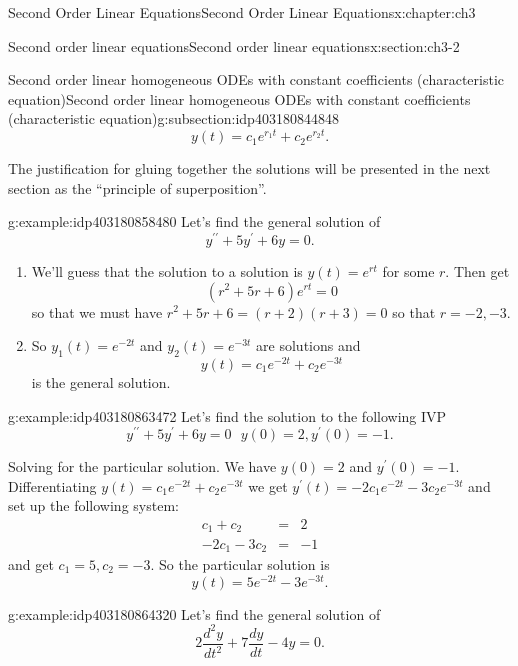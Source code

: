 \documentclass[oneside,10pt,]{book}
\numberwithin{equation}{section}
\numberwithin{equation}{section}
\newcommand{\amp}{&}
\begin{document}
\begin{chapterptx}{Second Order Linear Equations}{}{Second Order Linear Equations}{}{}{x:chapter:ch3}
\begin{sectionptx}{Second order linear equations}{}{Second order linear equations}{}{}{x:section:ch3-2}
\begin{subsectionptx}{Second order linear homogeneous ODEs with constant coefficients (characteristic equation)}{}{Second order linear homogeneous ODEs with constant coefficients (characteristic equation)}{}{}{g:subsection:idp403180844848}
\begin{equation*}
y(t)=c_{1}e^{r_{1}t}+c_{2}e^{r_{2}t}.
\end{equation*}
%
\par
The justification for gluing together the solutions will be presented in the next section as the ``principle of superposition''.%
\begin{example}{}{g:example:idp403180858480}%
Let's find the general solution of%
\begin{equation*}
y^{\prime\prime}+5y^{\prime}+6y=0.
\end{equation*}
%
%
\begin{enumerate}
\item{}We'll guess that the solution to a solution is \(y(t)=e^{rt}\) for some \(r\). Then get%
\begin{equation*}
\left(r^{2}+5r+6\right)e^{rt}=0
\end{equation*}
so that we must have \(r^{2}+5r+6=\left(r+2\right)\left(r+3\right)=0\) so that \(r=-2,-3\).%
\item{}So \(y_{1}(t)=e^{-2t}\) and \(y_{2}(t)=e^{-3t}\) are solutions and%
\begin{equation*}
y(t)=c_{1}e^{-2t}+c_{2}e^{-3t}
\end{equation*}
is the general solution.%
\end{enumerate}
\end{example}
\begin{example}{}{g:example:idp403180863472}%
Let's find the solution to the following IVP%
\begin{equation*}
y^{\prime\prime}+5y^{\prime}+6y=0\,\,\,\,y(0)=2,y^{\prime}(0)=-1.
\end{equation*}
%
\par
Solving for the particular solution. We have \(y(0)=2\) and \(y^{\prime}(0)=-1\). Differentiating \(y(t)=c_{1}e^{-2t}+c_{2}e^{-3t}\) we get \(y^{\prime}(t)=-2c_{1}e^{-2t}-3c_{2}e^{-3t}\) and set up the following system:%
\begin{align*}
c_{1}+c_{2} \amp = \amp 2\\
-2c_{1}-3c_{2} \amp = \amp -1
\end{align*}
and get \(c_{1}=5,c_{2}=-3\). So the particular solution is%
\begin{equation*}
y(t)=5e^{-2t}-3e^{-3t}.
\end{equation*}
%
\end{example}
\begin{example}{}{g:example:idp403180864320}%
Let's find the general solution of%
\begin{equation*}
2\frac{d^{2}y}{dt^{2}}+7\frac{dy}{dt}-4y=0.

\end{equation*}
\end{example}
\end{subsectionptx}
\end{sectionptx}
\end{chapterptx}
\end{document}
